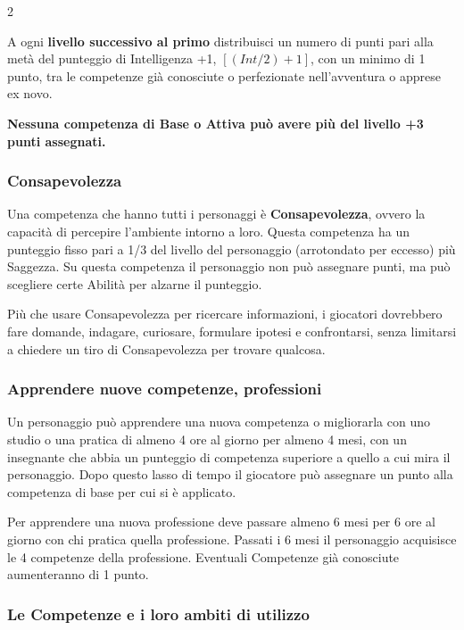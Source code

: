 \begin{multicols}{2}

A ogni \textbf{livello successivo al primo} distribuisci un numero di punti pari alla metà del punteggio di Intelligenza +1, $[(Int/2)+1]$, con un minimo di 1 punto, tra le competenze già conosciute o perfezionate nell'avventura o apprese ex novo.

\textbf{Nessuna competenza di Base o Attiva può avere più del livello +3 punti assegnati.}

\subsubsection{Consapevolezza}\label{consapevolezza}

Una competenza che hanno tutti i personaggi è \textbf{Consapevolezza}, ovvero la capacità di percepire l'ambiente intorno a loro. Questa competenza ha un punteggio fisso pari a 1/3 del livello del personaggio (arrotondato per eccesso) più Saggezza. Su questa competenza il personaggio non può assegnare punti, ma può scegliere certe Abilità per alzarne il punteggio.

Più che usare Consapevolezza per ricercare informazioni, i giocatori dovrebbero fare domande, indagare, curiosare, formulare ipotesi e confrontarsi, senza limitarsi a chiedere un tiro di Consapevolezza per trovare qualcosa.

\subsubsection{Apprendere nuove competenze, professioni}\label{apprenderenuovecompetenze}

Un personaggio può apprendere una nuova competenza o migliorarla con uno studio o una pratica di almeno 4 ore al giorno per almeno 4 mesi, con un insegnante che abbia un punteggio di competenza superiore a quello a cui mira il personaggio. Dopo questo lasso di tempo il giocatore può assegnare un punto alla competenza di base per cui si è applicato.

Per apprendere una nuova professione deve passare almeno 6 mesi per 6 ore al giorno con chi pratica quella professione. Passati i 6 mesi il personaggio acquisisce le 4 competenze della professione. Eventuali Competenze già conosciute aumenteranno di 1 punto.

\subsubsection{Le Competenze e i loro ambiti di utilizzo}\label{competenzeambitidiutilizzo}


\end{multicols}
